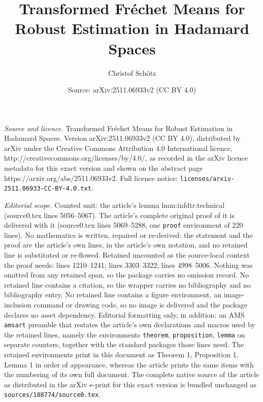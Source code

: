 \documentclass[10pt,a4paper]{amsart}
\title{Transformed Fr\'echet Means for Robust Estimation in Hadamard Spaces}
\author{Christof Sch\"otz}
\date{Source: arXiv:2511.06933v2 (CC BY 4.0)}
\begin{document}
\maketitle

\noindent\emph{Source and licence.} Transformed Fr\'echet Means for Robust Estimation in Hadamard Spaces. Version arXiv:2511.06933v2 (CC BY 4.0), distributed by arXiv under the Creative Commons Attribution 4.0 International licence, http://creativecommons.org/licenses/by/4.0/, as recorded in the arXiv licence metadata for this exact version and shown on the abstract page https://arxiv.org/abs/2511.06933v2. Full licence notice: \texttt{licenses/arxiv-2511.06933-CC-BY-4.0.txt}.\par\smallskip

\noindent\textit{Editorial scope.} Counted unit: the article's lemma lmm:infdtr:technical (source0.tex lines 5056--5067). The article's complete original proof of it is delivered with it (source0.tex lines 5069--5288, one \texttt{proof} environment of 220 lines). No mathematics is written, repaired or re-derived: the statement and the proof are the article's own lines, in the article's own notation, and no retained line is substituted or re-flowed.  Retained uncounted as the source-local context the proof needs: lines 1210--1241; lines 3303--3322; lines 4998--5006.  Nothing was omitted from any retained span, so the package carries no omission record.  No retained line contains a citation, so the wrapper carries no bibliography and no bibliography entry.  No retained line contains a figure environment, an image-inclusion command or drawing code, so no image is delivered and the package declares no asset dependency.  Editorial formatting only, in addition: an AMS \texttt{amsart} preamble that restates the article's own declarations and macros used by the retained lines, namely the environments \texttt{theorem}, \texttt{proposition}, \texttt{lemma} on separate counters, together with the standard packages those lines need.  The retained environments print in this document as Theorem 1, Proposition 1, Lemma 1 in order of appearance, whereas the article prints the same items with the numbering of its own full document.  The complete native source of the article as distributed in the arXiv e-print for this exact version is bundled unchanged as \texttt{sources/188774/source0.tex}.
\end{document}
